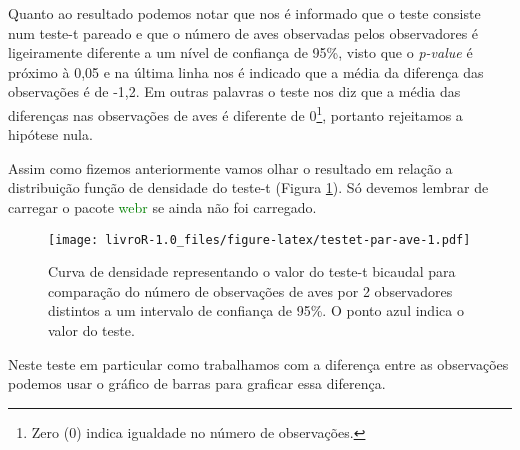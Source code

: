 \documentclass[titlepage, oneside, openany, a4paper]{book}
\newenvironment{Shaded}{\begin{snugshade}}{\end{snugshade}}
\newcommand{\DataTypeTok}[1]{\textcolor[rgb]{0.13,0.29,0.53}{#1}}
\newcommand{\DecValTok}[1]{\textcolor[rgb]{0.00,0.00,0.81}{#1}}
\newcommand{\FloatTok}[1]{\textcolor[rgb]{0.00,0.00,0.81}{#1}}
\newcommand{\KeywordTok}[1]{\textcolor[rgb]{0.13,0.29,0.53}{\textbf{#1}}}
\newcommand{\NormalTok}[1]{#1}
\newcommand{\OperatorTok}[1]{\textcolor[rgb]{0.81,0.36,0.00}{\textbf{#1}}}
\newcommand{\OtherTok}[1]{\textcolor[rgb]{0.56,0.35,0.01}{#1}}
\newcommand{\StringTok}[1]{\textcolor[rgb]{0.31,0.60,0.02}{#1}}
\begin{document}
Quanto ao resultado podemos notar que nos é informado que o teste consiste num teste-t pareado e que o número de aves observadas pelos observadores é ligeiramente diferente a um nível de confiança de 95\%, visto que o \emph{p-value} é próximo à 0,05 e na última linha nos é indicado que a média da diferença das observações é de -1,2. Em outras palavras o teste nos diz que a média das diferenças nas observações de aves é diferente de 0\footnote{Zero (0) indica igualdade no número de observações.}, portanto rejeitamos a hipótese nula.

Assim como fizemos anteriormente vamos olhar o resultado em relação a distribuição função de densidade do teste-t (Figura \ref{fig:testet-par-ave}). Só devemos lembrar de carregar o pacote \textcolor{green}{webr} se ainda não foi carregado.

\begin{Shaded}
\end{Shaded}

\begin{figure}
\centering
\texttt{[image: livroR-1.0\_files/figure-latex/testet-par-ave-1.pdf]}
\caption{\label{fig:testet-par-ave}Curva de densidade representando o valor do teste-t bicaudal para comparação do número de observações de aves por 2 observadores distintos a um intervalo de confiança de 95\%. O ponto azul indica o valor do teste.}
\end{figure}

Neste teste em particular como trabalhamos com a diferença entre as observações podemos usar o gráfico de barras para graficar essa diferença.

\begin{Shaded}
\end{Shaded}
\end{document}
